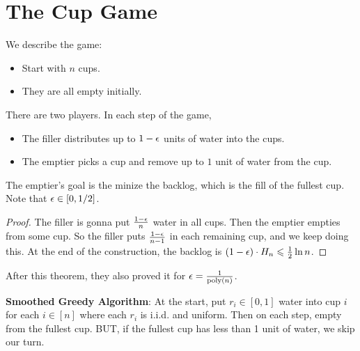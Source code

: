 \documentclass{report}
\begin{document}
\chapter{The Cup Game}
We describe the game:
\begin{itemize}
    \item Start with $n$ cups.
    \item They are all empty initially.
\end{itemize}
\noindent There are two players. In each step of the game, 
\begin{itemize}
    \item The filler distributes up to $1-\epsilon$ units of water into the cups.
    \item The emptier picks a cup and remove up to $1$ unit of water from the cup.
\end{itemize}
\noindent The emptier's goal is the minize the backlog, which is the fill of the fullest cup. Note that $\epsilon \in [0, 1/2]$. 
\begin{proof}
    The filler is gonna put $\frac{1-\epsilon}{n}$ water in all cups. Then the emptier empties from some cup. So the filler puts $\frac{1-\epsilon}{n-1}$ in each remaining cup, and we keep doing this. At the end of the construction, the backlog is $(1-\epsilon)\cdot H_n \leqslant \frac 12 \ln n$.
\end{proof}
\noindent After this theorem, they also proved it for $\epsilon = \frac{1}{\text{poly}(n)}$.

\noindent \textbf{Smoothed Greedy Algorithm}: At the start, put $r_i \in [0,1]$ water into cup $i$ for each $i \in [n]$ where each $r_i$ is i.i.d. and uniform. Then on each step, empty from the fullest cup. BUT, if the fullest cup has less than 1 unit of water, we skip our turn.
\end{document}
